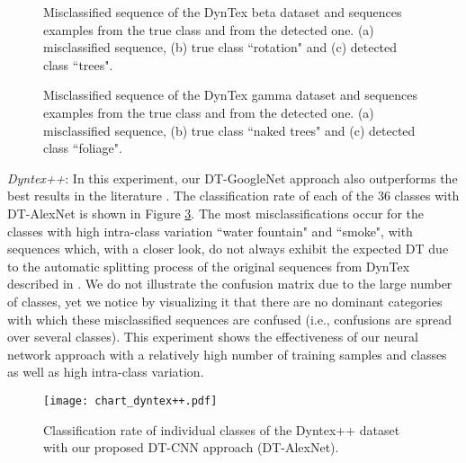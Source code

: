 \documentclass[a4paper,11pt]{article}
\begin{document}
\begin{figure}[!t]
\centerline{
\hfil
{}
\hfil
{}}
\caption{Misclassified sequence of the DynTex beta dataset and sequences examples from the true class and from the detected one.
(a) misclassified sequence, (b) true class ``rotation" and (c) detected class ``trees".}
\label{fig:misclass_beta}
\end{figure}
\begin{figure}[!t]
\centerline{
\hfil
{}
\hfil
{}}
\caption{Misclassified sequence of the DynTex gamma dataset and sequences examples from the true class and from the detected one.
(a) misclassified sequence, (b) true class ``naked trees" and (c) detected class ``foliage".}
\label{fig:misclass_gamma}
\end{figure}

\textit{Dyntex++}: In this experiment, our DT-GoogleNet approach also outperforms the best results in the literature \cite{tiwari2016dynamic}.
The classification rate of each of the 36 classes with DT-AlexNet is shown in Figure \ref{fig:chart_dyntex++}.
The most misclassifications occur for the classes with high intra-class variation ``water fountain" and ``smoke", with sequences which, with a closer look, do not always exhibit the expected DT due to the automatic splitting process of the original sequences from DynTex described in \cite{ghanem2010maximum}.
We do not illustrate the confusion matrix due to the large number of classes, yet we notice by visualizing it that there are no dominant categories with which these misclassified sequences are confused (i.e., confusions are spread over several classes). 
This experiment shows the effectiveness of our neural network approach with a relatively high number of training samples and classes as well as high intra-class variation.
\begin{figure}[!t]
\centering
\texttt{[image: chart\_dyntex++.pdf]}
  \caption{Classification rate of individual classes of the Dyntex++ dataset with our proposed DT-CNN approach (DT-AlexNet).}\label{fig:chart_dyntex++}
\end{figure}
\end{document}
